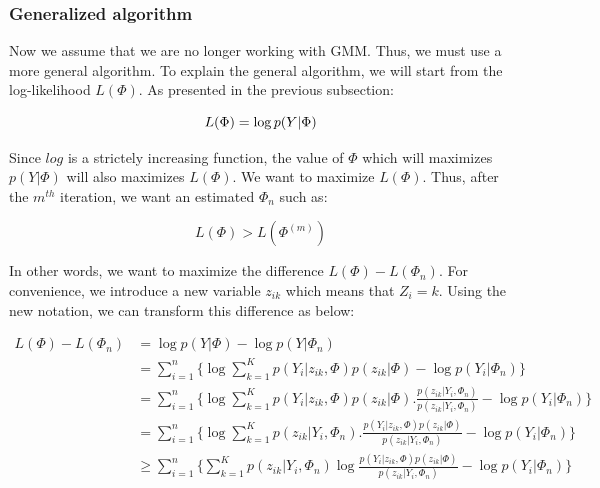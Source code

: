 \subsubsection{Generalized algorithm}\label{GENERAL}
Now we assume that we are no longer working with GMM. Thus, we must use a more general algorithm. %
To explain the general algorithm, we will start from the log-likelihood $L(\Phi)$. As presented in the previous subsection:

  \begin{equation*}
  L(\Phi)=\operatorname*{log} p(Y|\Phi)\\
  \end{equation*}
 
Since $log$ is a strictely increasing function, the value of $\Phi$ which will maximizes  $p(Y|\Phi)$ will also maximizes $L(\Phi)$. We want to maximize $L(\Phi)$. Thus, after the $m^{th}$ iteration, we want an estimated $\Phi_n$ such as:

  \begin{equation*}
  L(\Phi)>L(\Phi^{(m)})
  \end{equation*}
 
In other words, we want to maximize the difference $L(\Phi)-L(\Phi_n)$. For convenience, we introduce a new variable $z_{ik}$ which means that $Z_i=k$. Using the new notation, we can transform this difference as below:

 
  \begin{align*}
  L(\Phi)-L(\Phi_n) &=\operatorname*{log} p(Y|\Phi) -\operatorname*{log} p(Y|\Phi_n)\\
                    &=\sum_{i=1}^n\{\operatorname*{log} \sum_{k=1}^K p(Y_i|z_{ik},\Phi)p(z_{ik}|\Phi)-\operatorname*{log} p(Y_i|\Phi_n)\}\\
                    &=\sum_{i=1}^n\{\operatorname*{log} \sum_{k=1}^K p(Y_i|z_{ik},\Phi)p(z_{ik}|\Phi).\frac{p(z_{ik}|Y_i,\Phi_n)}{p(z_{ik}|Y_i,\Phi_n)}-\operatorname*{log} p(Y_i|\Phi_n)\}\\
                    &=\sum_{i=1}^n\{\operatorname*{log} \sum_{k=1}^K p(z_{ik}|Y_i,\Phi_n).\frac{p(Y_i|z_{ik},\Phi)p(z_{ik}|\Phi)}{p(z_{ik}|Y_i,\Phi_n)}-\operatorname*{log} p(Y_i|\Phi_n)\}\\
                    &\geq \sum_{i=1}^n\{\sum_{k=1}^K p(z_{ik}|Y_i,\Phi_n)\operatorname*{log} \frac{p(Y_i|z_{ik},\Phi)p(z_{ik}|\Phi)}{p(z_{ik}|Y_i,\Phi_n)}-\operatorname*{log} p(Y_i|\Phi_n)\}
  \end{align*}

